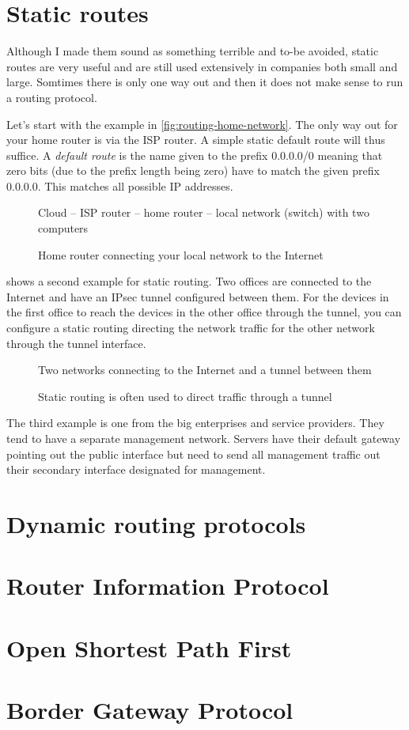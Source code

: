 \section{Static routes}

Although I made them sound as something terrible and to-be avoided, static routes are very useful and are still used extensively in companies both small and large.
Somtimes there is only one way out and then it does not make sense to run a routing protocol.

Let's start with the example in \vref{fig:routing-home-network}.
The only way out for your home router is via the ISP router.
A simple static default route will thus suffice.
A \emph{default route} is the name given to the prefix 0.0.0.0/0 meaning that zero bits (due to the prefix length being zero) have to match the given prefix 0.0.0.0.
This matches all possible IP addresses.


\begin{figure}
   \centering
   Cloud -- ISP router -- home router -- local network (switch) with two computers
   \caption{Home router connecting your local network to the Internet}
   \label{fig:routing-home-network}
\end{figure}


 shows a second example for static routing.
Two offices are connected to the Internet and have an IPsec  tunnel configured between them.
For the devices in the first office to reach the devices in the other office through the tunnel, you can configure a static routing directing the network traffic for the other network through the tunnel interface.


\begin{figure}
   \centering
   Two networks connecting to the Internet and a  tunnel between them
   \caption{Static routing is often used to direct traffic through a  tunnel}
   \label{fig:routing-static-vpn}
\end{figure}


The third example is one from the big enterprises and service providers.
They tend to have a separate management network.
Servers have their default gateway pointing out the public interface but need to send all management traffic out their secondary interface designated for management.



\section{Dynamic routing protocols}



\section{Router Information Protocol}


\section{Open Shortest Path First}

\section{Border Gateway Protocol}

